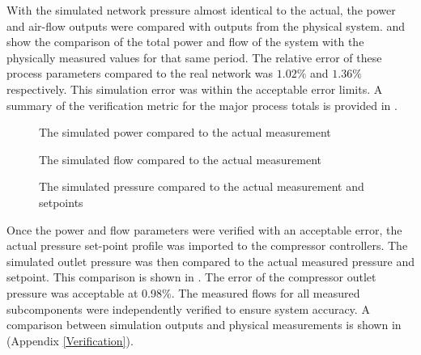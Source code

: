 With the simulated network pressure almost identical to the actual, the power and air-flow outputs were compared with outputs from the physical system.  and  show the comparison of the total power and flow of the system with the physically measured values for that same period. The relative error of these process parameters compared to the real network was $1.02 \%$ and $1.36 \%$ respectively. This simulation error was within the acceptable error limits. A summary of the  verification metric for the major process totals is provided in .
 \par
	\begin{figure}[h!]
		\centering
		
		\caption{The simulated power compared to the actual measurement}
		\label{fig: Verification Power kusasalethu}
	\end{figure}
	\begin{figure}[h!]
		\centering
		
		\caption{The simulated flow compared to the actual measurement}
		\label{fig: Verification Flow kusasalethu}
	\end{figure}
	 \begin{figure}[h!]
	 	\centering
	 	
	 	\caption{The simulated pressure compared to the actual measurement and setpoints}
	 	\label{fig: Verification Pressure kusasalethu Setpoint}
	 \end{figure}
	\clearpage
	Once the power and flow parameters were verified with an acceptable error, the actual pressure set-point profile was imported to the compressor controllers. The simulated outlet pressure was then compared to the actual measured pressure and setpoint. This comparison is shown in . The error of the compressor outlet pressure was acceptable at 0.98\%. The measured flows for all measured subcomponents were independently verified to ensure system accuracy. A comparison between simulation outputs and physical measurements is shown in (Appendix \ref{Verification}).
